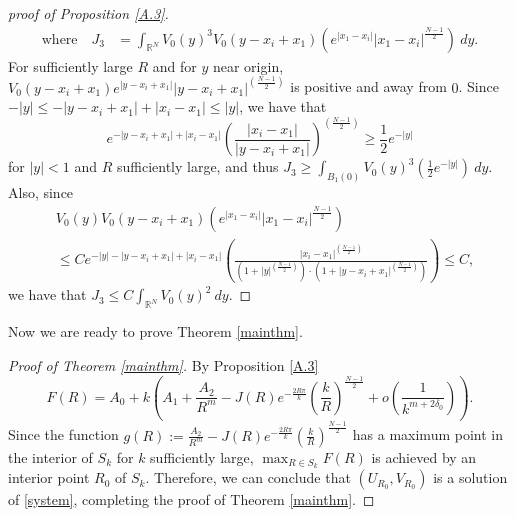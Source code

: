 \documentclass{amsart}
\theoremstyle{definition}
\theoremstyle{remark}
\numberwithin{equation}{section}
\begin{document}
\begin{proof}[proof of Proposition \ref{A.3}]
\begin{align*}
 \text{where} \quad J_3 &=  \int_{\mathbb{R}^{N}} V_0(y)^{3} V_0(y-x_i+x_1) \left(e^{\left|x_{1}-x_{i}\right|}|x_1-x_i|^{\frac{N-1}{2}}\right) \:dy.
\end{align*}
For sufficiently large $R$ and for $y$ near origin, $V_0(y-x_i+x_1)e^{|y-x_i+x_1|} |y-x_i+x_1|^{\left(\frac{N-1}{2}\right)}$ is positive and away from $0$. Since $  -|y| \le -|y-x_i+x_1| + |x_i-x_1| \le |y|$, we have that
$$e^{-|y-x_i+x_1|+|x_i-x_1|} \left(\frac{|x_i-x_1|}{|y-x_i+x_1|}\right)^{\left(\frac{N-1}{2}\right)} \ge \frac{1}{2} e^{-|y|}$$
for $|y|<1$ and $R$ sufficiently large, and thus $\displaystyle J_3 \ge \int_{B_1(0)} V_0(y)^3\left( \frac{1}{2}e^{-|y|}\right) \:dy.$ Also, since 
\begin{align*}
 &V_0(y)V_0(y-x_i+x_1) \left(e^{\left|x_{1}-x_{i}\right|}|x_1-x_i|^{\frac{N-1}{2}}\right) \\
 &\le C e^{-|y| - |y-x_i+x_1| + |x_i-x_1|}\left(\frac{|x_i-x_1|^{\left(\frac{N-1}{2}\right)}}{(1+|y|^{\left(\frac{N-1}{2}\right)})\cdot(1+|y-x_i+x_1|^{\left(\frac{N-1}{2}\right)})}\right) \le C,
\end{align*}
we have that $\displaystyle J_3 \le C\int_{\mathbb{R}^N} V_0(y)^2 \:dy$.
\end{proof}
Now we are ready to prove Theorem \ref{mainthm}.  
\begin{proof}[Proof of Theorem \ref{mainthm}]
By Proposition \ref{A.3} 
$$
F(R)= A_0+ 
 k\left(A_1+\frac{A_2}{R^{m}}-J(R)e^{-\frac{2R\pi}{k}}\left(\frac{k}{R}\right)^{\frac{N-1}{2}}+o\left(\frac{1}{k^{m+2\delta_0}}\right)\right).
$$Since  the function $g(R):=\frac{A_2}{R^{m}}-J(R)e^{-\frac{2R\pi}{k}}\left(\frac{k}{R}\right)^{\frac{N-1}{2}}$ has a maximum point in the interior of $S_k$ for $k$ sufficiently large,    $\max _{R \in S_{k}} F(R)$ is achieved by an interior point $R_0$ of $S_{k}$. Therefore,  we can conclude that  $(U_{R_0}, V_{R_0})$ is a solution of \eqref{system},  completing the proof of Theorem \ref{mainthm}.
\end{proof}
\end{document}
